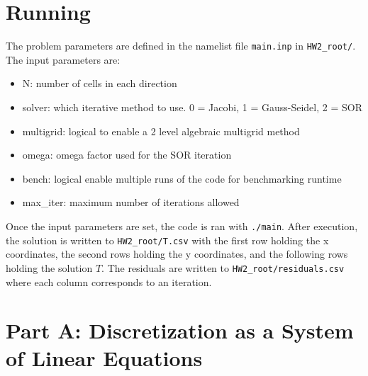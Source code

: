 \documentclass[reqno, 12pt]{amsart}
\begin{document}
    \section*{Running}
    \noindent The problem parameters are defined in the namelist file \texttt{main.inp} in \texttt{HW2\_root/}.
    The input parameters are:
    \begin{itemize}
        \setlength\itemsep{-0.1em}
        \item N: number of cells in each direction
        \item solver: which iterative method to use. 0 = Jacobi, 1 = Gauss-Seidel, 2 = SOR
        \item multigrid: logical to enable a 2 level algebraic multigrid method
        \item omega: omega factor used for the SOR iteration
        \item bench: logical enable multiple runs of the code for benchmarking runtime
        \item max\_iter: maximum number of iterations allowed
    \end{itemize}
    Once the input parameters are set, the code is ran with \texttt{./main}.
    After execution, the solution is written to \texttt{HW2\_root/T.csv} with the first row holding the x coordinates, the second rows holding the y coordinates, and the following rows holding the solution $T$.
    The residuals are written to  \texttt{HW2\_root/residuals.csv} where each column corresponds to an iteration.
    \newpage

    \section{Part A: Discretization as a System of Linear Equations}
\end{document}
